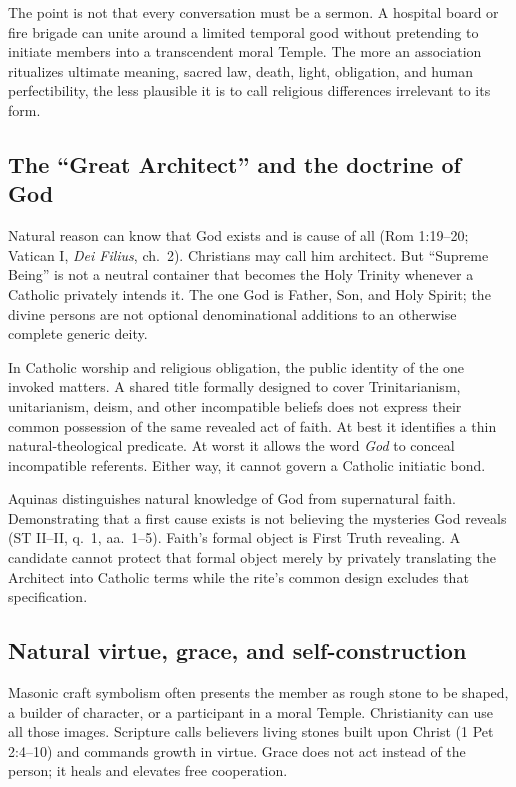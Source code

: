 The point is not that every conversation must be a sermon. A hospital board or fire brigade can unite around a limited temporal good without pretending to initiate members into a transcendent moral Temple. The more an association ritualizes ultimate meaning, sacred law, death, light, obligation, and human perfectibility, the less plausible it is to call religious differences irrelevant to its form.

\subsection{The “Great Architect” and the doctrine of God}

Natural reason can know that God exists and is cause of all (Rom 1:19--20; Vatican I, \emph{Dei Filius}, ch.~2). Christians may call him architect. But “Supreme Being” is not a neutral container that becomes the Holy Trinity whenever a Catholic privately intends it. The one God is Father, Son, and Holy Spirit; the divine persons are not optional denominational additions to an otherwise complete generic deity.

In Catholic worship and religious obligation, the public identity of the one invoked matters. A shared title formally designed to cover Trinitarianism, unitarianism, deism, and other incompatible beliefs does not express their common possession of the same revealed act of faith. At best it identifies a thin natural-theological predicate. At worst it allows the word \emph{God} to conceal incompatible referents. Either way, it cannot govern a Catholic initiatic bond.

Aquinas distinguishes natural knowledge of God from supernatural faith. Demonstrating that a first cause exists is not believing the mysteries God reveals (ST II--II, q.~1, aa.~1--5). Faith's formal object is First Truth revealing. A candidate cannot protect that formal object merely by privately translating the Architect into Catholic terms while the rite's common design excludes that specification.

\subsection{Natural virtue, grace, and self-construction}

Masonic craft symbolism often presents the member as rough stone to be shaped, a builder of character, or a participant in a moral Temple. Christianity can use all those images. Scripture calls believers living stones built upon Christ (1 Pet 2:4--10) and commands growth in virtue. Grace does not act instead of the person; it heals and elevates free cooperation.

